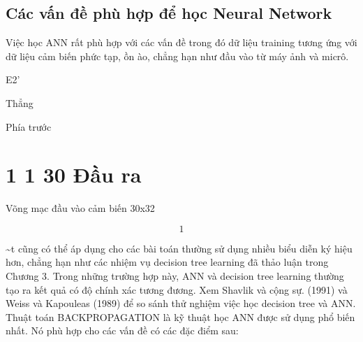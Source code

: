 \subsection{Các vấn đề phù hợp để học Neural Network}

Việc học ANN rất phù hợp với các vấn đề trong đó dữ liệu training tương ứng với dữ liệu cảm biến phức tạp, ồn ào, chẳng hạn như đầu vào từ máy ảnh và micrô.

E2'

Thẳng

Phía trước

\section{1 1 30 Đầu ra}

Võng mạc đầu vào cảm biến 30x32

\[1\]

\textasciitilde{}t cũng có thể áp dụng cho các bài toán thường sử dụng nhiều biểu diễn ký hiệu hơn, chẳng hạn như các nhiệm vụ decision tree learning đã thảo luận trong Chương 3. Trong những trường hợp này, ANN và decision tree learning thường tạo ra kết quả có độ chính xác tương đương. Xem Shavlik và cộng sự. (1991) và Weiss và Kapouleas (1989) để so sánh thử nghiệm việc học decision tree và ANN. Thuật toán BACKPROPAGATION là kỹ thuật học ANN được sử dụng phổ biến nhất. Nó phù hợp cho các vấn đề có các đặc điểm sau:

